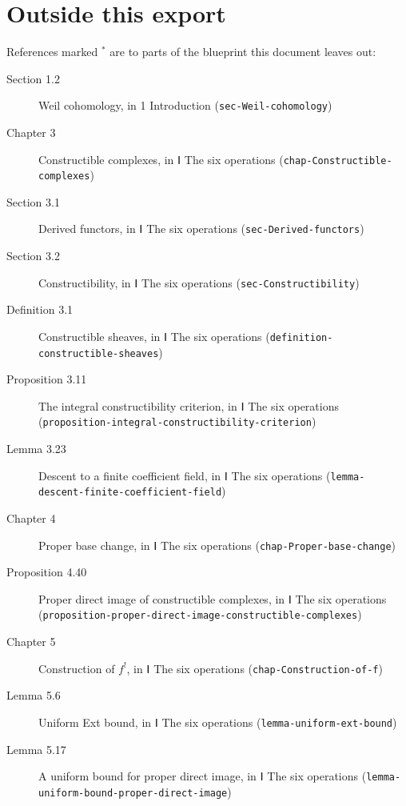 \documentclass[11pt]{article}
\newcommand{\bpslug}[1]{\texttt{#1}}
\begin{document}
\section*{Outside this export}
References marked \ensuremath{{}^\ast} are to parts of the blueprint this document leaves out:
\begin{description}
\item[Section 1.2] Weil cohomology, in 1 Introduction (\bpslug{sec-{}\allowbreak{}Weil-{}\allowbreak{}cohomology})
\item[Chapter 3] Constructible complexes, in Ⅰ The six operations (\bpslug{chap-{}\allowbreak{}Constructible-{}\allowbreak{}complexes})
\item[Section 3.1] Derived functors, in Ⅰ The six operations (\bpslug{sec-{}\allowbreak{}Derived-{}\allowbreak{}functors})
\item[Section 3.2] Constructibility, in Ⅰ The six operations (\bpslug{sec-{}\allowbreak{}Constructibility})
\item[Definition 3.1] Constructible sheaves, in Ⅰ The six operations (\bpslug{definition-{}\allowbreak{}constructible-{}\allowbreak{}sheaves})
\item[Proposition 3.11] The integral constructibility criterion, in Ⅰ The six operations (\bpslug{proposition-{}\allowbreak{}integral-{}\allowbreak{}constructibility-{}\allowbreak{}criterion})
\item[Lemma 3.23] Descent to a finite coefficient field, in Ⅰ The six operations (\bpslug{lemma-{}\allowbreak{}descent-{}\allowbreak{}finite-{}\allowbreak{}coefficient-{}\allowbreak{}field})
\item[Chapter 4] Proper base change, in Ⅰ The six operations (\bpslug{chap-{}\allowbreak{}Proper-{}\allowbreak{}base-{}\allowbreak{}change})
\item[Proposition 4.40] Proper direct image of constructible complexes, in Ⅰ The six operations (\bpslug{proposition-{}\allowbreak{}proper-{}\allowbreak{}direct-{}\allowbreak{}image-{}\allowbreak{}constructible-{}\allowbreak{}complexes})
\item[Chapter 5] Construction of $f^!$, in Ⅰ The six operations (\bpslug{chap-{}\allowbreak{}Construction-{}\allowbreak{}of-{}\allowbreak{}f})
\item[Lemma 5.6] Uniform Ext bound, in Ⅰ The six operations (\bpslug{lemma-{}\allowbreak{}uniform-{}\allowbreak{}ext-{}\allowbreak{}bound})
\item[Lemma 5.17] A uniform bound for proper direct image, in Ⅰ The six operations (\bpslug{lemma-{}\allowbreak{}uniform-{}\allowbreak{}bound-{}\allowbreak{}proper-{}\allowbreak{}direct-{}\allowbreak{}image})

\end{description}
\end{document}
